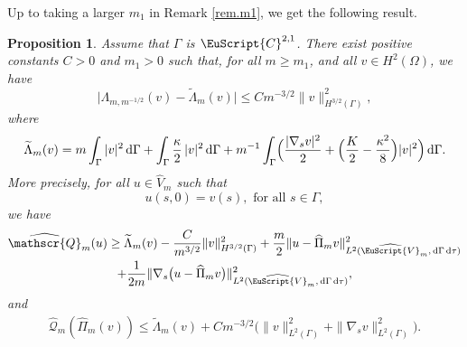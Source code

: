 \documentclass[JEP,XML,SOM,Unicode]{cedram}
\let\mathcal \EuScript
\newcommand{\scrQ}{\mathscr{Q}}
\newcommand{\cC}{\mathcal{C}}
\newcommand{\cV}{\mathcal{V}}
\theoremstyle{plain}
\newtheorem{proposition}[theorem]{Proposition}
\theoremstyle{definition}
\newcommand{\dx}{\mathrm{\,d}}
\begin{document}
Up to taking a larger $m_1$ in Remark \ref{rem.m1}, we get the following result.

\begin{proposition}\label{lem:effop}
Assume that $\Gamma$ is $\cC^{2,1}$.
There exist positive constants $C>0$ and $m_1>0$ such that, for all $m\geq m_1$, and all $v\in H^{2}(\Omega)$, we have
\[
\big|\Lambda_{m,m^{-1/2}}(v)-\widetilde \Lambda_{m}(v)\big|\leq Cm^{-3/2}\|v\|^2_{H^{3/2}(\Gamma)},
\]
where
\[
\widetilde \Lambda_{m}(v) = m\int_\Gamma
|v|^2
\dx\Gamma
+
\int_\Gamma
\frac{\kappa}{2}\,|v|^2
\dx\Gamma
+
m^{-1}\int_\Gamma \Bigl(
\frac{|\nabla_s v|^2}{2}
+
\Bigl(\frac{K}{2}-\frac{\kappa^2}{8} \Bigr)|v|^2
\Bigr)\dx\Gamma.
\]
More precisely, for all $u\in \widehat{V}_m$ such that
\[
u(s,0)= v(s), \mbox{ for all }s\in \Gamma,
\]
we have
\begin{multline*}
\widehat{\scrQ}_m(u)\geq \widetilde \Lambda_{m}(v)
-\frac{C}{m^{3/2}} \|v\|_{H^{3/2}(\Gamma)} ^2
+\frac{m}{2}
\|u-\widehat{\Pi}_m v\|^2_{L^2(\widehat{\cV}_m, \dx\Gamma\dx\tau)}
\\
+\frac{1}{2m}
\|\nabla_s \bigl(u - \widehat{\Pi}_m v\bigr)\|^2_{L^2(\widehat{\cV}_m, \dx\Gamma\dx\tau)},
\end{multline*}
and
\[\begin{split}
\widehat{\scrQ}_m(\widehat{\Pi}_m(v))\leq \widetilde \Lambda_{m}(v)
+Cm^{-3/2} \bigl(\|v\|^2_{L^2(\Gamma)} + \|\nabla_s v\|^2_{L^2(\Gamma)}\bigr).
\end{split}\]
\end{proposition}
\end{document}
